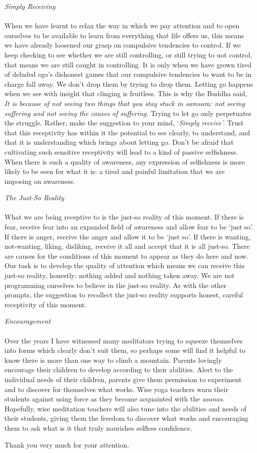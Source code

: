 \emph{Simply Receiving\\
~\\
}When we have learnt to relax the way in which we pay attention and to
open ourselves to be available to learn from everything that life offers
us, this means we have already loosened our grasp on compulsive
tendencies to control. If we keep checking to see whether we are still
controlling, or still trying to not control, that means we are still
caught in controlling. It is only when we have grown tired of deluded
ego's dishonest games that our compulsive tendencies to want to be in
charge fall away. We don't drop them by trying to drop them. Letting go
happens when we see with insight that clinging is fruitless. This is why
the Buddha said, \emph{It is because of not seeing two things that you
stay stuck in samsara: not seeing suffering and not seeing the causes of
suffering.} Trying to let go only perpetuates the struggle. Rather, make
the suggestion to your mind, `\emph{Simply receive'.} Trust that this
receptivity has within it the potential to see clearly, to understand,
and that it is understanding which brings about letting go. Don't be
afraid that cultivating such sensitive receptivity will lead to a kind
of passive selfishness. When there is such a quality of awareness, any
expression of selfishness is more likely to be seen for what it is: a
tired and painful limitation that we are imposing on awareness.

\emph{The Just-So Reality\\
~\\
}What we are being receptive to is the just-so reality of this moment.
If there is fear, receive fear into an expanded field of awareness and
allow fear to be `just so'. If there is anger, receive the anger and
allow it to be `just so'. If there is wanting, not-wanting, liking,
disliking, receive it all and accept that it is all just-so. There are
causes for the conditions of this moment to appear as they do here and
now. Our task is to develop the quality of attention which means we can
receive this just-so reality, honestly: nothing added and nothing taken
away. We are not programming ourselves to believe in the just-so
reality. As with the other prompts, the suggestion to recollect the
just-so reality supports honest, careful receptivity of this moment.

\emph{Encouragement\\
}~\\
Over the years I have witnessed many meditators trying to squeeze
themselves into forms which clearly don't suit them, so perhaps some
will find it helpful to know there is more than one way to climb a
mountain. Parents lovingly encourage their children to develop according
to their abilities. Alert to the individual needs of their children,
parents give them permission to experiment and to discover for
themselves what works. Wise yoga teachers warn their students against
using force as they become acquainted with the \emph{asanas}. Hopefully,
wise meditation teachers will also tune into the abilities and needs of
their students, giving them the freedom to discover what works and
encouraging them to ask what is it that truly nourishes selfless
confidence.

Thank you very much for your attention.

